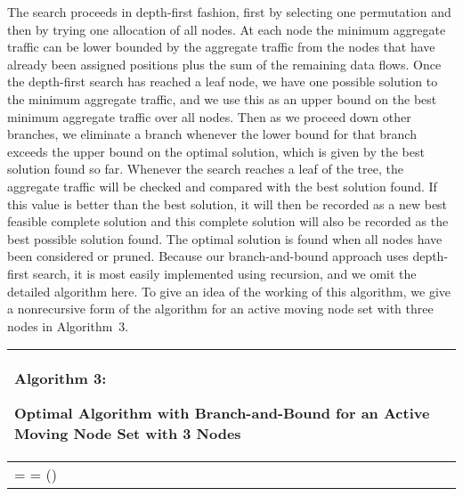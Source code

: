 \documentclass[10pt,conference]{IEEEtran}
\begin{document}
The search proceeds in depth-first fashion, first by selecting one
permutation and then by trying one allocation of all nodes.  At each
node the minimum aggregate traffic can be lower bounded by the
aggregate traffic from the nodes that have already been assigned
positions plus the sum of the remaining data flows.  Once the
depth-first search has reached a leaf node, we have one possible
solution to the minimum aggregate traffic, and we use this as an upper
bound on the best minimum aggregate traffic over all nodes.  Then as
we proceed down other branches, we eliminate a branch whenever the
lower bound for that branch exceeds the upper bound on the optimal
solution, which is given by the best solution found so far.  Whenever
the search reaches a leaf of the tree, the aggregate traffic will be
checked and compared with the best solution found. If this value is
better than the best solution, it will then be recorded as a new best
feasible complete solution and this complete solution
 will also be recorded as the best possible
solution found. The optimal solution is found when all nodes
have been considered or pruned.  Because our branch-and-bound approach
uses depth-first search, it is most easily implemented using
recursion, and we omit the detailed algorithm here.  To give an idea
of the working of this algorithm, we give a nonrecursive form of the
algorithm for an active moving node set with three nodes in
Algorithm~3.

\begin{algorithm}[t]

\begin{tabular}[c]{p{8cm}}


\hline
{\scriptsize \begin{bf}Algorithm 3: \end{bf} Optimal Algorithm with
  Branch-and-Bound for an Active Moving Node Set with 3 Nodes}\\

\hline


{\scriptsize
\KwIn{
Non-moving node subgraph, ; active moving node set \AM;
    initial graph 
}
\SetKwFunction{AT}{AggregateTraffic}
\SetKwFunction{AN}{AttachNode}
\SetKwFunction{GAP}{GetAllPermutations}
\SetKwFunction{RF}{RemainingFlows}

\RF{} \;

 = \AT{}\;
 = \GAP(\AM )\;



\ForEach{}{

\ForEach{}{

 = \AN{}\;
  = \AT{}\;

\ForEach{}{
 \RF{}\;

\eIf{
  }
{
   = \AN{}\;
   = \AT{}\;
  \ForEach{}{
 \RF{}\;
\eIf{}
{
   = \AN{}\;
   = \AT{}\;
  \If{)} {
  \;
  \AM.anchorlabel = GetAnchorLabel()\;
  \AM.desiredlabel =
  GetDesiredLabel()\;
}
}{break\;}} }{break\;}

}

}

}

}
\\
\hline


\end{tabular}

\end{algorithm}
\end{document}
